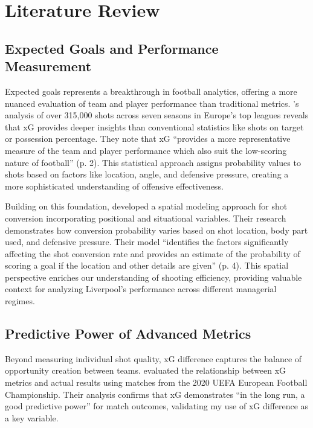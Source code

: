 \documentclass[12pt]{article}
\begin{document}
\section*{Literature Review}

\subsection*{Expected Goals and Performance Measurement}

Expected goals represents a breakthrough in football analytics, offering a more nuanced evaluation of team and player performance than traditional metrics. \citet{cavus2022}'s analysis of over 315,000 shots across seven seasons in Europe's top leagues reveals that xG provides deeper insights than conventional statistics like shots on target or possession percentage. They note that xG ``provides a more representative measure of the team and player performance which also suit the low-scoring nature of football'' (p. 2). This statistical approach assigns probability values to shots based on factors like location, angle, and defensive pressure, creating a more sophisticated understanding of offensive effectiveness.

Building on this foundation, \citet{deb2019} developed a spatial modeling approach for shot conversion incorporating positional and situational variables. Their research demonstrates how conversion probability varies based on shot location, body part used, and defensive pressure. Their model ``identifies the factors significantly affecting the shot conversion rate and provides an estimate of the probability of scoring a goal if the location and other details are given'' (p. 4). This spatial perspective enriches our understanding of shooting efficiency, providing valuable context for analyzing Liverpool's performance across different managerial regimes.

\subsection*{Predictive Power of Advanced Metrics}

Beyond measuring individual shot quality, xG difference captures the balance of opportunity creation between teams. \citet{roccetti2024} evaluated the relationship between xG metrics and actual results using matches from the 2020 UEFA European Football Championship. Their analysis confirms that xG demonstrates ``in the long run, a good predictive power'' for match outcomes, validating my use of xG difference as a key variable.
\end{document}
